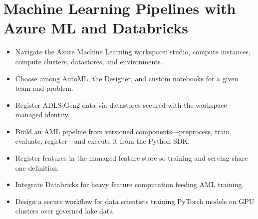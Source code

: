 \chapter{Machine Learning Pipelines with Azure ML and Databricks}
%
\begin{objectives}
\begin{itemize}
    \item Navigate the Azure Machine Learning workspace: studio, compute instances, compute clusters, datastores, and environments.
    \item Choose among AutoML, the Designer, and custom notebooks for a given team and problem.
    \item Register ADLS Gen2 data via datastores secured with the workspace managed identity.
    \item Build an AML pipeline from versioned components---preprocess, train, evaluate, register---and execute it from the Python SDK.
    \item Register features in the managed feature store so training and serving share one definition.
    \item Integrate Databricks for heavy feature computation feeding AML training.
    \item Design a secure workflow for data scientists training PyTorch models on GPU clusters over governed lake data.
\end{itemize}
\end{objectives}

